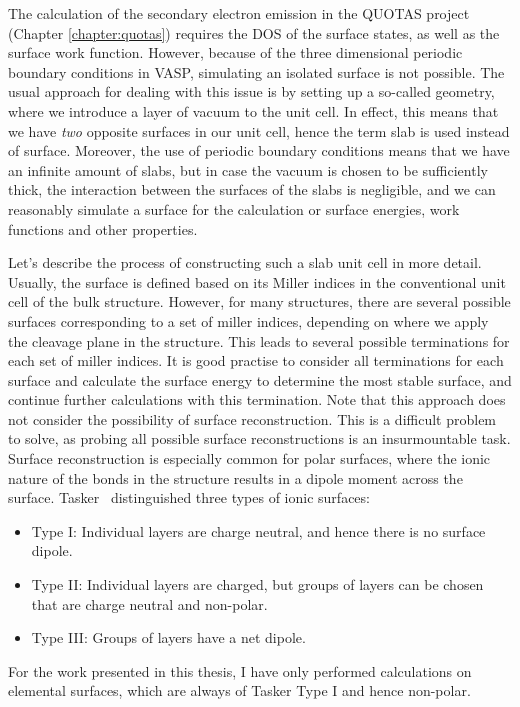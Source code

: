\begin{refsection}
The calculation of the secondary electron emission in the QUOTAS project 
(Chapter \ref{chapter:quotas}) requires the DOS of the surface states, as well 
as the surface work function. However, because of the three dimensional 
periodic boundary conditions in VASP, simulating an isolated surface 
is not possible. The usual approach for dealing with this issue is by setting 
up a so-called  geometry, where we introduce a layer of vacuum to 
the unit cell. In effect, this means that we have \textit{two} opposite 
surfaces in our unit cell, hence the term slab is used instead of surface. 
Moreover, the use of periodic boundary conditions means that we have an 
infinite amount of slabs, but in case the vacuum is chosen to be sufficiently 
thick, the interaction between the surfaces of the slabs is negligible, and we 
can reasonably simulate a surface for the calculation or surface energies, 
work functions and other properties.  
 
Let's describe the process of constructing such a slab unit cell in more 
detail. Usually, the surface is defined based on its Miller indices in the 
conventional unit cell of the bulk structure. However, for many structures, 
there are several possible surfaces corresponding to a set of miller indices, 
depending on where we apply the cleavage plane in the structure. This leads to 
several possible terminations for each set of miller indices. It is good 
practise to consider all terminations for each surface and calculate the 
surface energy to determine the most stable surface, and continue further 
calculations with this termination. Note that this approach does not consider 
the possibility of surface reconstruction. This is a difficult problem to 
solve, as probing all possible surface reconstructions is an insurmountable 
task. Surface reconstruction is especially common for polar surfaces, where 
the ionic nature of the bonds in the structure results in a dipole 
moment across the surface. Tasker~\cite{Tasker1979} distinguished three types 
of ionic surfaces: 
\begin{itemize} 
\item Type I: Individual layers are charge neutral, and hence there is no 
surface dipole. 
\item Type II: Individual layers are charged, but groups of layers can be 
chosen that are charge neutral and non-polar. 
\item Type III: Groups of layers have a net dipole. 
\end{itemize} 
For the work presented in this thesis, I have only performed calculations on 
elemental surfaces, which are always of Tasker Type I and hence non-polar. 
 

\end{refsection}
